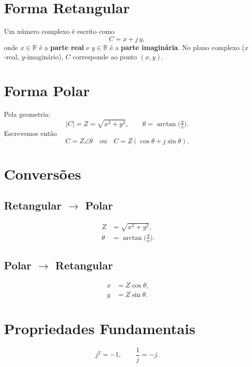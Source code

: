 \section{Forma Retangular}
Um número complexo é escrito como
\[
C = x + j\,y,
\]
onde \(x\in\mathbb{R}\) é a \textbf{parte real} e \(y\in\mathbb{R}\) é a \textbf{parte imaginária}. No plano complexo (\(x\)-real, \(y\)-imaginário), \(C\) corresponde ao ponto \((x,y)\).

\section{Forma Polar}
Pela geometria:
\[
|C| = Z = \sqrt{x^{2}+y^{2}}, \qquad
\theta = \arctan\!\bigl(\tfrac{y}{x}\bigr).
\]
Escrevemos então
\[
C = Z \angle \theta
\quad\text{ou}\quad
C = Z(\cos\theta + j\sin\theta).
\]

\section{Conversões}
\begin{minipage}{0.49\textwidth}
\subsection{Retangular \(\rightarrow\) Polar}
\[
\boxed{\;
\begin{aligned}
Z &= \sqrt{x^{2}+y^{2}},\\
\theta &= \arctan\!\bigl(\tfrac{y}{x}\bigr).
\end{aligned}}
\]
\end{minipage}\hfill
\begin{minipage}{0.49\textwidth}
\subsection{Polar \(\rightarrow\) Retangular}
\[
\boxed{\;
\begin{aligned}
x &= Z\cos\theta,\\
y &= Z\sin\theta.
\end{aligned}}
\]
\end{minipage}

\section{Propriedades Fundamentais}
\[
j^2=-1, \qquad \frac{1}{j} = -j.
\]

